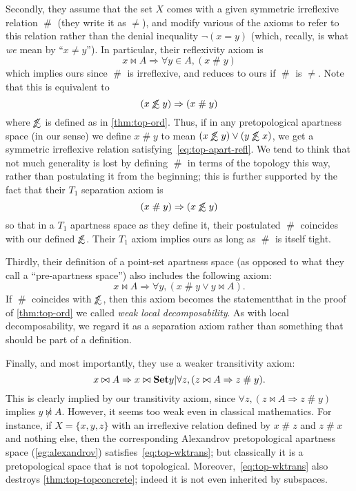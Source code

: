 \documentclass{article}
\def\apart{\mathrel{\#}}
\def\oapt{\mathrel{\!\not\,\not\lesssim}}
\let\implies\Rightarrow
\begin{document}
Secondly, they assume that the set $X$ comes with a given symmetric irreflexive relation $\apart$ (they write it as $\neq$), and modify various of the axioms to refer to this relation rather than the denial inequality $\neg(x=y)$ (which, recally, is what \emph{we} mean by ``$x\neq y$'').
In particular, their reflexivity axiom is
\begin{equation}
  x\bowtie A \implies \forall y\in A, (x\apart y)\label{eq:top-apart-refl}
\end{equation}
which implies ours since $\apart$ is irreflexive, and reduces to ours if $\apart$ is $\neq$.
Note that this is equivalent to
\[ (x\oapt y) \implies (x\apart y) \]
where $\oapt$ is defined as in \cref{thm:top-ord}.
Thus, if in any pretopological apartness space (in our sense) we define $x\apart y$ to mean $(x\oapt y)\lor (y\oapt x)$, we get a symmetric irreflexive relation satisfying~\eqref{eq:top-apart-refl}.
We tend to think that not much generality is lost by defining $\apart$ in terms of the topology this way, rather than postulating it from the beginning; this is further supported by the fact that their $T_1$ separation axiom is
\[ (x\apart y) \implies (x\oapt y) \]
so that in a $T_1$ apartness space as they define it, their postulated $\apart$ coincides with our defined $\oapt$.
Their $T_1$ axiom implies ours as long as $\apart$ is itself tight.

Thirdly, their definition of a point-set apartness space (as opposed to what they call a ``pre-apartness space'') also includes the following axiom:
\[ x\bowtie A \implies \forall y, (x\apart y \lor y\bowtie A). \]
If $\apart$ coincides with $\oapt$, then this axiom becomes the statementthat in the proof of \cref{thm:top-ord} we called \emph{weak local decomposability}.
As with local decomposability, we regard it as a separation axiom rather than something that should be part of a definition.

Finally, and most importantly, they use a weaker transitivity axiom:
\begin{equation}
  x\bowtie A \implies x \bowtie \setof{ y | \forall z, (z\bowtie A \implies z\apart y)}.\label{eq:top-wktrans}
\end{equation}
This is clearly implied by our transitivity axiom, since $\forall z, (z\bowtie A \implies z\apart y)$ implies $y\not\bowtie A$.
However, it seems too weak even in classical mathematics.
For instance, if $X = \{x,y,z\}$ with an irreflexive relation defined by $x\apart z$ and $z\apart x$ and nothing else, then the corresponding Alexandrov pretopological apartness space (\cref{eg:alexandrov}) satisfies~\eqref{eq:top-wktrans}; but classically it is a pretopological space that is not topological.
Moreover,~\eqref{eq:top-wktrans} also destroys \cref{thm:top-topconcrete}; indeed it is not even inherited by subspaces.
\end{document}
